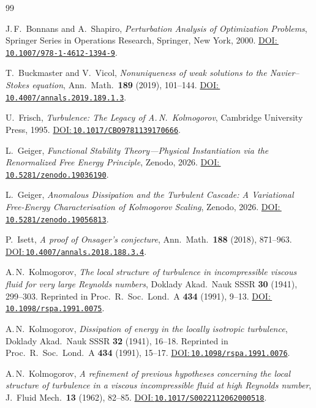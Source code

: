 \documentclass[12pt,a4paper]{article}
\newcommand{\doilink}[1]{\href{https://doi.org/#1}{DOI:\,\nolinkurl{#1}}}
\theoremstyle{definition}
\theoremstyle{plain}
\theoremstyle{remark}
\begin{document}
\clearpage


\begingroup
\small
\sloppy
\setlength{\itemsep}{0.18em}
\begin{thebibliography}{99}

J.\,F.~Bonnans and A.~Shapiro,
\emph{Perturbation Analysis of Optimization Problems},
Springer Series in Operations Research, Springer, New York, 2000.
\doilink{10.1007/978-1-4612-1394-9}.

T.~Buckmaster and V.~Vicol,
\emph{Nonuniqueness of weak solutions to the Navier--Stokes equation},
Ann.\ Math.\ \textbf{189} (2019), 101--144.
\doilink{10.4007/annals.2019.189.1.3}.

U.~Frisch,
\emph{Turbulence: The Legacy of A.\,N.\ Kolmogorov},
Cambridge University Press, 1995.
\doilink{10.1017/CBO9781139170666}.

L.~Geiger, \emph{Functional Stability Theory---Physical Instantiation via the Renormalized Free Energy Principle},
Zenodo, 2026.
\doilink{10.5281/zenodo.19036190}.

L.~Geiger,
\emph{Anomalous Dissipation and the Turbulent Cascade: A Variational Free-Energy Characterisation of Kolmogorov Scaling},
Zenodo, 2026.
\doilink{10.5281/zenodo.19056813}.

P.~Isett,
\emph{A proof of Onsager's conjecture},
Ann.\ Math.\ \textbf{188} (2018), 871--963.
\doilink{10.4007/annals.2018.188.3.4}.

A.\,N.~Kolmogorov,
\emph{The local structure of turbulence in incompressible viscous fluid
for very large Reynolds numbers},
Doklady Akad.\ Nauk SSSR \textbf{30} (1941), 299--303.
Reprinted in Proc.\ R.\ Soc.\ Lond.\ A \textbf{434} (1991), 9--13.
\doilink{10.1098/rspa.1991.0075}.

A.\,N.~Kolmogorov,
\emph{Dissipation of energy in the locally isotropic turbulence},
Doklady Akad.\ Nauk SSSR \textbf{32} (1941), 16--18.
Reprinted in Proc.\ R.\ Soc.\ Lond.\ A \textbf{434} (1991), 15--17.
\doilink{10.1098/rspa.1991.0076}.

A.\,N.~Kolmogorov,
\emph{A refinement of previous hypotheses concerning the local structure
of turbulence in a viscous incompressible fluid at high Reynolds number},
J.~Fluid Mech.\ \textbf{13} (1962), 82--85.
\doilink{10.1017/S0022112062000518}.


\end{thebibliography}
\end{document}

